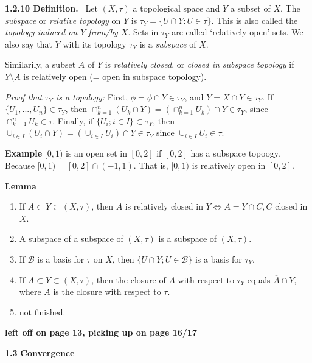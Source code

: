 \documentclass[12pt]{article}
\newcommand{\lrimply}[0] { \Leftrightarrow }
\newcommand{\B}[0] { \mathcal{B} }
\begin{document}
\begin{flushleft}
 { \bf 1.2.10 Definition. } \ Let $(X, \tau)$ a topological space and $Y$ a 
subset of $X$.  The \emph{subspace} or \emph{relative topology} on $Y$ is 
$\tau_Y = \{ U \cap Y: U \in \tau \}$. This is also 
called the \emph{topology induced on $Y$ from/by $X$}. Sets in $\tau_Y$ are 
called `relatively open' sets. We also say that $Y$ with its topology $\tau_Y$ is a \emph{subspace} of $X$. 

Similarily, a subset $A$ of $Y$ is \emph{relatively closed}, or \emph{closed in subspace topology} if $Y \setminus A$ is relatively open (= open in subspace topology).\begin{flushleft} 
 \emph{Proof that $\tau_Y$ is a topology:}  First, 
 $\phi = \phi \cap Y \in \tau_Y$, and $Y = X \cap Y \in \tau_Y$.
If  $\{ U_1, ..., U_n \} \in \tau_Y$, then $\cap_{k=1}^n (U_k \cap Y) = \left( \cap_{k=1}^n U_k \right) \cap Y \in \tau_Y$, since $\cap_{k=1}^n U_k \in \tau$. Finally, if $\{ U_i; i \in I \} \subset \tau_Y$, then $\cup_{i \in I} ( U_i \cap Y) = \left( \cup_{i \in I} U_i \right) \cap Y \in \tau_Y$ since $\cup_{i \in I} U_i \in \tau$.\end{flushleft}\end{flushleft}\begin{flushleft} 
 { \bf Example }$[0,1)$ is an open set in $[0,2]$ if $[0,2]$ has a subspace topoogy. Because $[0,1) = [0,2] \cap (-1,1)$. 
That is, $[0,1)$ 
 is relatively open in $[0,2]$.\end{flushleft}\begin{flushleft} 
 { \bf Lemma }\begin{enumerate}
\item If $A \subset Y \subset (X, \tau)$, then $A$ is relatively closed in $Y \lrimply A = Y \cap C, C$ closed in $X$.
\item A subspace of a subspace of $(X, \tau)$ is a subspace of $(X, \tau)$.
\item If $\B$ is a basis for $\tau$ on $X$, then $\{ U \cap Y; U \in \B \}$ is a basis for $\tau_Y$.
\item If $A \subset Y \subset (X, \tau)$, then the closure of $A$ with respect to $\tau_Y$ equals $\overline{A} \cap Y$, where $\overline{A}$ is the closure with respect to $\tau$. 
\item not finished.
\end{enumerate}\end{flushleft}
{\bf left off on page 13, picking up on page 16/17}

\begin{flushleft}
{\bf 1.3 }{\bf Convergence }
\end{flushleft}
\end{document}
